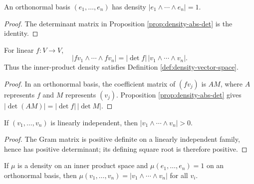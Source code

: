 \begin{proposition}
\label{prop:density-value-one}
\leanok
{}
An orthonormal basis $(e_1,\ldots,e_n)$ has density $|e_1\wedge\cdots\wedge e_n|=1$.
\end{proposition}

\begin{proof}
\leanok
{}
\sketch The determinant matrix in Proposition \ref{prop:density-abs-det} is the identity.
\end{proof}

\begin{proposition}
\label{prop:density-transformation-law}
\leanok
{}
For linear $f:V\to V$,
\[
|fv_1\wedge\cdots\wedge fv_n|=|\det f|\,|v_1\wedge\cdots\wedge v_n|.
\]
Thus the inner-product density satisfies Definition \ref{def:density-vector-space}.
\end{proposition}

\begin{proof}
\leanok
{}
\sketch In an orthonormal basis, the coefficient matrix of $(fv_j)$ is $AM$, where $A$ represents $f$ and $M$ represents $(v_j)$. Proposition \ref{prop:density-abs-det} gives $|\det(AM)|=|\det f|\,|\det M|$.
\end{proof}

\begin{proposition}
\label{prop:density-positive}
\leanok
{}
If $(v_1,\ldots,v_n)$ is linearly independent, then $|v_1\wedge\cdots\wedge v_n|>0$.
\end{proposition}

\begin{proof}
\leanok
{}
\sketch The Gram matrix is positive definite on a linearly independent family, hence has positive determinant; its defining square root is therefore positive.
\end{proof}

\begin{proposition}
\label{prop:density-uniqueness-pointwise}
\leanok
{}
If $\mu$ is a density on an inner product space and $\mu(e_1,\ldots,e_n)=1$ on an orthonormal basis, then $\mu(v_1,\ldots,v_n)=|v_1\wedge\cdots\wedge v_n|$ for all $v_i$.
\end{proposition}


